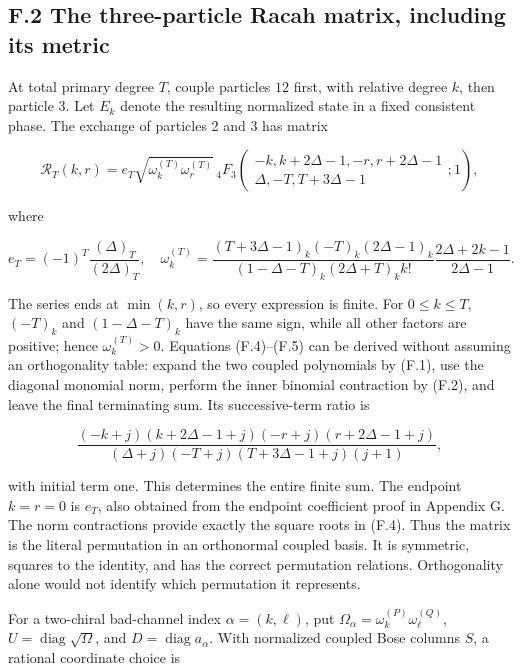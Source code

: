 \documentclass[a4paper,11pt]{article}
\numberwithin{equation}{section}
\begin{document}
\hypertarget{f.2-the-three-particle-racah-matrix-including-its-metric}{%
\subsection{F.2 The three-particle Racah matrix, including its metric}\label{f.2-the-three-particle-racah-matrix-including-its-metric}}

At total primary degree \(T\), couple particles \(12\) first, with relative degree \(k\), then particle 3. Let \(E_k\) denote the resulting normalized state in a fixed consistent phase. The exchange of particles 2 and 3 has matrix

\[
\mathcal R_T(k,r)=e_T\sqrt{\omega_k^{(T)}\omega_r^{(T)}}
\,{}_4F_3\!\left(
\begin{matrix}-k,k+2\Delta-1,-r,r+2\Delta-1\\
\Delta,-T,T+3\Delta-1\end{matrix};1\right),
\tag{F.4}
\]

where

\[
e_T=(-1)^T\frac{(\Delta)_T}{(2\Delta)_T},
\quad
\omega_k^{(T)}=
\frac{(T+3\Delta-1)_k(-T)_k(2\Delta-1)_k}
{(1-\Delta-T)_k(2\Delta+T)_k k!}
\frac{2\Delta+2k-1}{2\Delta-1}.
\tag{F.5}
\]

The series ends at \(\min(k,r)\), so every expression is finite. For \(0\le k\le T\), \((-T)_k\) and \((1-\Delta-T)_k\) have the same sign, while all other factors are positive; hence \(\omega_k^{(T)}>0\). Equations (F.4)--(F.5) can be derived without assuming an orthogonality table: expand the two coupled polynomials by (F.1), use the diagonal monomial norm, perform the inner binomial contraction by (F.2), and leave the final terminating sum. Its successive-term ratio is

\[
\frac{(-k+j)(k+2\Delta-1+j)(-r+j)(r+2\Delta-1+j)}
{(\Delta+j)(-T+j)(T+3\Delta-1+j)(j+1)},
\tag{F.6}
\]

with initial term one. This determines the entire finite sum. The endpoint \(k=r=0\) is \(e_T\), also obtained from the endpoint coefficient proof in Appendix G. The norm contractions provide exactly the square roots in (F.4). Thus the matrix is the literal permutation in an orthonormal coupled basis. It is symmetric, squares to the identity, and has the correct permutation relations. Orthogonality alone would not identify which permutation it represents.

For a two-chiral bad-channel index \(\alpha=(k,\ell)\), put \(\Omega_\alpha=\omega_k^{(P)}\omega_\ell^{(Q)}\), \(U=\operatorname{diag}\sqrt\Omega\), and \(D=\operatorname{diag}a_\alpha\). With normalized coupled Bose columns \(S\), a rational coordinate choice is
\end{document}
